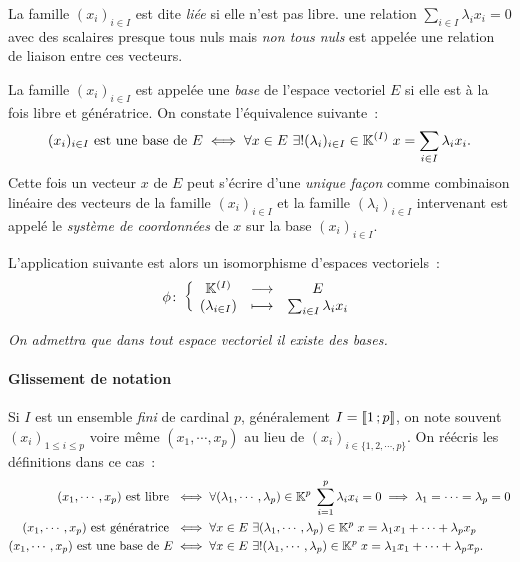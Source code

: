 La famille $(x_i)_{i \in I}$ est dite \emph{liée} si elle n'est pas libre. une relation $\sum_{i \in I} \lambda_i x_i = 0$ avec des scalaires presque tous nuls mais \emph{non tous nuls} est appelée une relation de liaison entre ces vecteurs.

La famille $(x_i)_{i \in I}$ est appelée une \emph{base} de l'espace vectoriel $E$ si elle est à la fois libre et génératrice. On constate l'équivalence suivante~:
\begin{equation}
	(x_i)_{i \in I} \text{ est une base de } E \iff \forall x \in E \ \exists !  (\lambda_i)_{i \in I} \in \mathbb{K}^{(I)} \; x = \sum_{i \in I} \lambda_i x_i.
\end{equation}
Cette fois un vecteur $x$ de $E$ peut s'écrire d'une \emph{unique façon} comme combinaison linéaire des vecteurs de la famille $(x_i)_{i \in I}$ et la famille $(\lambda_i)_{i \in I}$ intervenant est appelé le \emph{système de coordonnées} de $x$ sur la base $(x_i)_{i \in I}$.

L'application suivante est alors un isomorphisme d'espaces vectoriels~:
\begin{equation}
	\phi\colon \left\{\begin{array}{ccc} \mathbb{K}^{(I)} & \longrightarrow &E\\ (\lambda_{i \in I}) & \longmapsto & \sum_{i \in I} \lambda_i x_i \end{array} \right.
\end{equation}

\emph{On admettra que dans tout espace vectoriel il existe des bases.}

\paragraph{Glissement de notation}
Si $I$ est un ensemble \emph{fini} de cardinal $p$, généralement $I = \mathopen{\llbracket}1\mathclose{}\mathpunct{};p\mathclose{\rrbracket}$, on note souvent $(x_i)_{1 \leqslant i \leqslant p}$ voire même $(x_1, \cdots, x_p)$ au lieu de $(x_i)_{i \in \{1, 2, \cdots, p\}}$. On réécris les définitions dans ce cas~:
\begin{align}
	(x_1, \cdots, x_p) \text{ est libre } &\iff \forall (\lambda_1, \cdots, \lambda_p) \in \mathbb{K}^{p} \; \sum_{i=1}^p \lambda_i x_i = 0 \implies \lambda_1=\cdots=\lambda_p=0 \\
	(x_1, \cdots, x_p) \text{ est génératrice } &\iff \forall x \in E \ \exists  (\lambda_1, \cdots, \lambda_p) \in \mathbb{K}^{p} \; x = \lambda_1 x_1 + \cdots + \lambda_p x_p \\
	(x_1, \cdots, x_p) \text{ est une base de } E &\iff \forall x \in E \ \exists ! (\lambda_1, \cdots, \lambda_p) \in \mathbb{K}^{p} \; x = \lambda_1 x_1 + \cdots + \lambda_p x_p.
\end{align}

